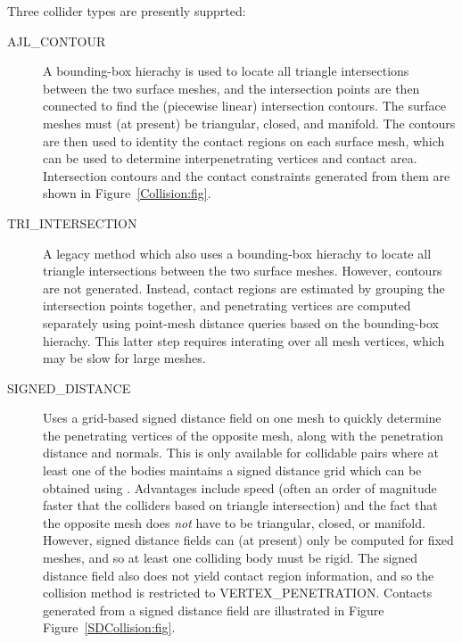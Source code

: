 Three collider types are presently supprted:

\begin{description}

\item[AJL\_CONTOUR]\mbox{}

A bounding-box hierachy is used to locate all triangle intersections
between the two surface meshes, and the intersection points are then
connected to find the (piecewise linear) intersection contours.  The
surface meshes must (at present) be triangular, closed, and manifold.
The contours are then used to identity the contact regions
on each surface mesh, which can be used to determine interpenetrating
vertices and contact area. Intersection contours and the contact
constraints generated from them are shown in Figure~\ref{Collision:fig}.

\item[TRI\_INTERSECTION]\mbox{}

A legacy method which also uses a bounding-box hierachy to locate all
triangle intersections between the two surface meshes. However,
contours are not generated. Instead, contact regions are estimated by
grouping the intersection points together, and penetrating vertices
are computed separately using point-mesh distance queries based on the
bounding-box hierachy. This latter step requires interating over all
mesh vertices, which may be slow for large meshes.

\item[SIGNED\_DISTANCE]\mbox{}

Uses a grid-based signed distance field on one mesh to quickly
determine the penetrating vertices of the opposite mesh, along with
the penetration distance and normals.  This is only available for
collidable pairs where at least one of the bodies maintains a signed
distance grid which can be obtained using
.
Advantages include speed (often
an order of magnitude faster that the colliders based on triangle
intersection) and the fact that the opposite mesh does {\it not} have
to be triangular, closed, or manifold.  However, signed distance
fields can (at present) only be computed for fixed meshes, and so at
least one colliding body must be rigid.  The signed distance field
also does not yield contact region information, and so the collision
method is restricted to
%
{VERTEX\_PENETRATION}.
Contacts generated from a signed distance field are illustrated in
Figure Figure~\ref{SDCollision:fig}.

\end{description}

